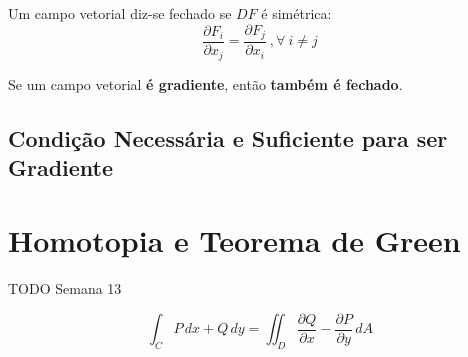 \documentclass[11pt, a4paper]{article}
\begin{document}
Um campo vetorial diz-se fechado se $DF$ é simétrica:
\begin{equation*}
    \frac{\partial F_i}{\partial x_j} = \frac{\partial F_j}{\partial x_i}
    \ , \forall \  i \neq j
\end{equation*}

Se um campo vetorial \textbf{é gradiente}, então \textbf{também é fechado}.

\subsection{Condição Necessária e Suficiente para ser Gradiente}

\section{Homotopia e Teorema de Green}

TODO Semana 13

\begin{equation*}
    \int_{C} P \, dx + Q \, dy =
    \iint_{D} \frac{\partial Q}{\partial x} - \frac{\partial P}{\partial y} \, dA
\end{equation*}
\end{document}
